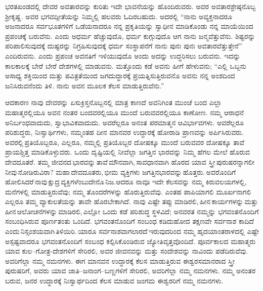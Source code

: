 ಭರತಖಂಡದಲ್ಲಿ ದೇವರ ಅವತಾರವನ್ನು ಕುರಿತು ಇದೇ ಭಾವನೆಯನ್ನು ಹೊಂದಿರುವರು. ಅವರ ಅವತಾರಶ್ರೇಷ್ಠನೊಬ್ಬ ಶ‍್ರೀಕೃಷ್ಣ. ಅವರ ಭಗವದ್ಗೀತೆಯನ್ನು ನಿಮ್ಮಲ್ಲಿ ಹಲವರು ಓದಿರಬಹುದು. ಅದರಲ್ಲಿ “ನಾನು ಅವ್ಯಕ್ತನಾದರೂ ಅಜನಾದರೂ ಸರ್ವಭೂತಗಳಿಗೆ ಒಡೆಯನಾದರೂ ನನ್ನ ಪ್ರಕೃತಿಯನ್ನು ಸ್ವಾಧೀನ ಮಾಡಿಕೊಂಡು ನನ್ನ ಮಾಯೆಯಿಂದ ಪ್ರಪಂಚಕ್ಕೆ ಬರುವೆನು. ಎಂದು ಅಧರ್ಮ ಹೆಚ್ಚುವುದೊ, ಧರ್ಮ ಕುಗ್ಗುವುದೊ ಆಗ ನಾನು ಜನ್ಮವೆತ್ತುವೆನು. ಶಿಷ್ಟರನ್ನು ಪರಿಪಾಲಿಸುವುದಕ್ಕೆ ದುಷ್ಟರನ್ನು ನಿಗ್ರಹಿಸುವುದಕ್ಕೆ ಧರ್ಮ ಸಂಸ್ಥಾಪನೆಗೆ ನಾನು ಪುನಃ ಪುನಃ ಅವತಾರವೆತ್ತುತ್ತೇನೆ” ಎಂದಿರುವನು. ಎಂದು ಪ್ರಪಂಚ ಅವನತಿಗೆ ಇಳಿಯುವುದೊ ಅಂದು ಅದನ್ನು ಉದ್ಧರಿಸಲು ಬರುವನು. ಇದನ್ನು ಕಾಲಕಾಲಕ್ಕೆ ಬೇರೆ ಬೇರೆ ದೇಶಗಳಲ್ಲಿ ಮಾಡುವನು. ಮತ್ತೊಂದು ಕಡೆ ಅವನು ಹೀಗೆ ಹೇಳುವನು; “ಎಲ್ಲಿ ಒಬ್ಬನು ಅಸಾಧ್ಯ ಶಕ್ತಿಯಿಂದ ಮತ್ತು ಪವಿತ್ರತೆಯಿಂದ ಜಗದುದ್ಧಾರಕ್ಕೆ ಪ್ರಯತ್ನಿಸುತ್ತಿರುವನೊ ಅವನು ನನ್ನ ಅಂಶದಿಂದ ಜನಿಸಿರುವನೆಂದು ತಿಳಿ. ನಾನು ಅವನ ಮೂಲಕ ಕೆಲಸ ಮಾಡುತ್ತಿರುವೆನು.”

ಆದಕಾರಣ ನಾವು ದೇವರನ್ನು ಏಸುಕ್ರಿಸ್ತನೊಬ್ಬನಲ್ಲಿ ಮಾತ್ರ ಕಾಣದೆ ಅವನಿಗಿಂತ ಮುಂಚೆ ಬಂದ ಎಲ್ಲಾ ಮಹಾತ್ಮರಲ್ಲಿಯೂ ಅವನ ನಂತರ ಬಂದವರಲ್ಲಿಯೂ ಮುಂದೆ ಬರುವವರಲ್ಲಿಯೂ ಕಾಣೋಣ. ನಮ್ಮ ಆರಾಧನೆ ಅನಿರ್ಬಂಧವಾದುದು, ಸ್ವಾಭಾವಿಕವಾ\-ದುದು. ಅವರೆಲ್ಲರೂ ಅನಂತ ಪರಮಾತ್ಮನ ಆವಿರ್ಭಾವಗಳು. ಅವರೆಲ್ಲರೂ ಪರಿಶುದ್ಧರು, ನಿಃಸ್ವಾರ್ಥಿಗಳು, ನಮ್ಮಂತಹ ದೀನ ಮಾನವರ ಉದ್ಧಾರಕ್ಕೆ ಹೋರಾಡಿ ಪ್ರಾಣವನ್ನು ಅರ್ಪಿಸಿ\break ರುವರು.\,ಅವರಲ್ಲಿ\,ಪ್ರತಿಯೊಬ್ಬರೂ, ಎಲ್ಲರೂ, ನಮ್ಮಲ್ಲಿ ಪ್ರತಿಯೊಬ್ಬರ ದೋಷಕ್ಕೂ ಮುಂದೆ ಬರುವವರ ದೋಷಕ್ಕೂ ತಾವೆ ಪ್ರಾಯಶ್ಚಿತ್ತ ಮಾಡಿಕೊಳ್ಳುವರು. ಒಂದು ದೃಷ್ಟಿಯಲ್ಲಿ ನೀವೆಲ್ಲಾ ಜಗತ್ತಿನ ಭಾರವನ್ನು ನಿಮ್ಮ ಹೆಗಲ ಮೇಲೆ ಹೊರುವ ದೇವದೂತರೆ. ತಮ್ಮ ಜೀವನದ\,ಭಾರವನ್ನು\,ತಾವೆ\,ಮೌನವಾಗಿ,\,ಸಾವಧಾನವಾಗಿ ಹೊರದ ಯಾವ ಸ್ತ್ರೀ\,ಪುರುಷ\break ರನ್ನಾಗಲೀ\,ನೀವು\,ನೋಡಿರುವಿರಾ? ಮಹಾ\,ದೇವದೂತರು,\,ಭೀಮ ವ್ಯಕ್ತಿಗಳು ಜಗತ್ತಿನ\break ಭಾರವನ್ನು\,ಹೊತ್ತರು.\,ಅವರೊಂದಿಗೆ\,ಹೋಲಿಸಿದರೆ\,ನಾವು\,ಕ್ಷುದ್ರ\,ವ್ಯಕ್ತಿಗಳೆಂಬುದೇನೊ\,ನಿಜ.\break ಆದರೂ ನಾವೂ ಇದೇ ಕೆಲಸವನ್ನು ನಮ್ಮ ಕಿರುವಲಯಗಳಲ್ಲಿ, ಮನೆಗಳಲ್ಲಿ ಮಾಡುತ್ತಿ\break ರುವೆವು; ನಮ್ಮ ತೊಂದರೆಗಳನ್ನು ಹೊರುತ್ತಿರುವೆವು. ಎಂತಹ ಪಾಪಿಯಾಗಲಿ ಮೂರ್ಖನಾಗಲಿ ಎಲ್ಲರೂ ತಮ್ಮ ವ್ಯಾಕುಲತೆಯನ್ನು ತಾವೇ ಹೊರಬೇಕಾಗಿದೆ. ನಾವು ಎಷ್ಟೇ ತಪ್ಪು ಮಾಡಿ\break ರಲಿ,\,ಹೀನ\,ಕಾರ್ಯಗಳನ್ನು\,ಮತ್ತು ಹೀನ\,ಆಲೋಚನೆಗಳನ್ನು\,ಮಾಡಿರಲಿ,\,ಎಲ್ಲೋ ಒಂದು ಕಡೆ ಪರಿಶುದ್ಧ ಸ್ಥಳವಿದೆ; ಅನವರತ ನಮ್ಮನ್ನು ಭಗವಂತನೊಂದಿಗೆ ಸಂಬಂಧಿಸಿರುವ ಪೂರ್ಣತಂತು ಒಂದಿದೆ. ಭಗವಂತನೊಂದಿಗೆ ಸಂಬಂಧ ಕಡಿದುಹೋದ ತಕ್ಷಣವೇ ಸರ್ವನಾಶ ಕಾದಿದೆ\,ಎಂದು\,ನಿಸ್ಸಂಶಯವಾಗಿ\,ತಿಳಿಯಿರಿ.\,ಯಾರೂ ಸರ್ವನಾಶವಾಗಲಾರದೆ\,ಇರುವುದ\break ರಿಂದ ನಮ್ಮ ಹೃದಯಾಂತರಾಳದಲ್ಲಿ ಎಷ್ಟೇ ಅಸ್ಪಷ್ಟವಾದರೂ ಭಗವಂತನೊಂದಿಗೆ ಸಂಬಂಧ ಕಲ್ಪಿಸಿಕೊಂಡಿರುವ ಜ್ಯೋತಿವೃತ್ತವೊಂದಿದೆ. ಪೂರ್ವಕಾಲದ ಮಹಾತ್ಮರು ಯಾವ ಕುಲ–\break ಗೋತ್ರ-ದೇಶಗಳಿಗೆ ಸೇರಿರಲಿ, ಅವರ ಜೀವನವನ್ನು ಮತ್ತು ಸಂದೇಶವನ್ನು ನಾವಿಂದು ಪಡೆದಿರುವೆವು. ಅವರಿಗೆಲ್ಲಾ ನಮ್ಮ ನಮನಗಳು. ಈಗ ಮಾನವನ ಉದ್ಧಾರಕ್ಕೆ ಕೆಲಸ ಮಾಡುತ್ತಿರುವ ಈಶ್ವರಸಮಾನರಾದ ಸ್ತ್ರೀ ಪುರುಷರಿಗೆ, ಅವರು ಯಾವ ಜಾತಿ–ಜನಾಂಗ–\break ಬಣ್ಣಗಳಿಗೆ ಸೇರಿರಲಿ, ಅವರಿಗೆಲ್ಲಾ ನಮ್ಮ ನಮನಗಳು. ನಮ್ಮ ಅನಂತರ ಬರುವ, ಜನರ ಉದ್ಧಾರಕ್ಕೆ ನಿಃಸ್ವಾರ್ಥದಿಂದ ಕೆಲಸ ಮಾಡುವ ಜಂಗಮ ಈಶ್ವರರಿಗೆ ನಮ್ಮ ನಮನಗಳು.

